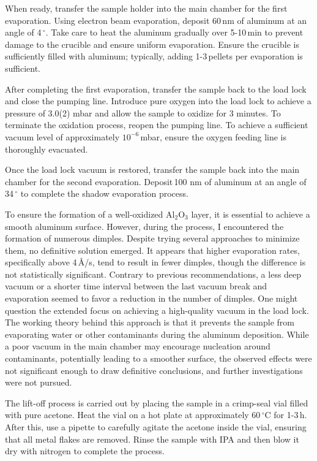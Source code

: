         When ready, transfer the sample holder into the main chamber for the first evaporation. Using electron beam evaporation, deposit 60\,nm of aluminum at an angle of 4\,$^\circ$. Take care to heat the aluminum gradually over 5-10\,min to prevent damage to the crucible and ensure uniform evaporation. Ensure the crucible is sufficiently filled with aluminum; typically, adding 1-3\,pellets per evaporation is sufficient.

        After completing the first evaporation, transfer the sample back to the load lock and close the pumping line. Introduce pure oxygen into the load lock to achieve a pressure of 3.0(2) mbar and allow the sample to oxidize for 3 minutes. To terminate the oxidation process, reopen the pumping line. To achieve a sufficient vacuum level of approximately $10^{-6}$\,mbar, ensure the oxygen feeding line is thoroughly evacuated.

        Once the load lock vacuum is restored, transfer the sample back into the main chamber for the second evaporation. Deposit\,100 nm of aluminum at an angle of 34\,$^\circ$ to complete the shadow evaporation process.

        To ensure the formation of a well-oxidized Al$_\text{2}$O$_\text{3}$ layer, it is essential to achieve a smooth aluminum surface. However, during the process, I encountered the formation of numerous dimples. Despite trying several approaches to minimize them, no definitive solution emerged. It appears that higher evaporation rates, specifically above 4\,\AA/s, tend to result in fewer dimples, though the difference is not statistically significant. Contrary to previous recommendations, a less deep vacuum or a shorter time interval between the last vacuum break and evaporation seemed to favor a reduction in the number of dimples. One might question the extended focus on achieving a high-quality vacuum in the load lock. The working theory behind this approach is that it prevents the sample from evaporating water or other contaminants during the aluminum deposition. While a poor vacuum in the main chamber may encourage nucleation around contaminants, potentially leading to a smoother surface, the observed effects were not significant enough to draw definitive conclusions, and further investigations were not pursued.

        The lift-off process is carried out by placing the sample in a crimp-seal vial filled with pure acetone. Heat the vial on a hot plate at approximately 60\,$^\circ$C for 1-3\,h. After this, use a pipette to carefully agitate the acetone inside the vial, ensuring that all metal flakes are removed. Rinse the sample with IPA and then blow it dry with nitrogen to complete the process.

